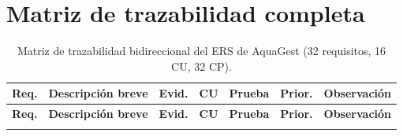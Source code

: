 \documentclass[11pt,a4paper]{article}
\begin{document}
\section{Matriz de trazabilidad completa}

\begin{longtable}{|p{1.4cm}|p{4.3cm}|p{1.6cm}|p{1.6cm}|p{1.6cm}|p{1cm}|p{2.7cm}|}
\caption{Matriz de trazabilidad bidireccional del ERS de AquaGest (32 requisitos, 16 CU, 32 CP).}
\label{tab:matriz-completa} \\
\hline
\textbf{Req.} & \textbf{Descripción breve} & \textbf{Evid.} & \textbf{CU} & \textbf{Prueba} & \textbf{Prior.} & \textbf{Observación} \\ \hline
\endfirsthead
\hline
\textbf{Req.} & \textbf{Descripción breve} & \textbf{Evid.} & \textbf{CU} & \textbf{Prueba} & \textbf{Prior.} & \textbf{Observación} \\ \hline
\endhead
\hline \endfoot
\hline \endlastfoot


\end{longtable}
\end{document}
